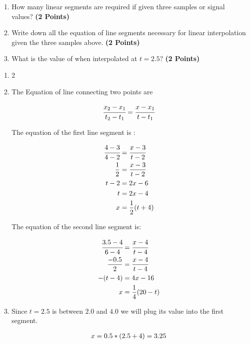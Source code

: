 \documentclass[12pt, xcolor=dvipsnames,svgnames,x11names]{article}
\makeatletter
\newenvironment{multiequation}[1][]{%
\begin{equation}%
   \begin{aligned}%
   \ifx#1\@empty\else\label{#1}\fi%
}{%
   \end{aligned}%
\end{equation}%
}
\makeatother
\begin{document}
\begin{enumerate}
\item How many linear segments are required if given three samples or signal values? \textbf{(2 Points)}
\item Write down all the equation of line segments necessary for linear interpolation given the three samples above. \textbf{(2 Points)}
\item  What is the value of when interpolated at $t = 2.5$?  \textbf{(2 Points)}
\end{enumerate}


\begin{answerbox}
\begin{enumerate}
\item 2

\item

The Equation of line connecting two points are

\begin{multiequation}
\cfrac{x_2 - x_1}{t_2 - t_1} = \cfrac{x - x_1}{t  - t_1}
\end{multiequation}

The equation of the first line segment is :


\begin{multiequation}
\cfrac{4 - 3}{4 - 2} & = \cfrac{x - 3}{t  - 2}\\
\frac{1}{2} & = \frac{x - 3}{t - 2}\\
t - 2 & = 2x - 6\\
t & = 2x - 4\\
x & = \frac{1}{2}(t + 4)
\end{multiequation}

The equation of the second line segment is:

\begin{multiequation}
\cfrac{3.5 - 4}{6 - 4} & = \cfrac{x - 4}{t  - 4}\\
\frac{-0.5}{2} & = \frac{x - 4}{t - 4}\\
-(t-4) & = 4x - 16\\
x & = \frac{1}{4}(20 - t)
\end{multiequation}


\item Since $t = 2.5$ is between $2.0$ and $4.0$ we will plug its value into the first segment.

\begin{multiequation}
x = 0.5*(2.5 + 4) = 3.25
\end{multiequation}


\end{enumerate}

\end{answerbox}
\end{document}

